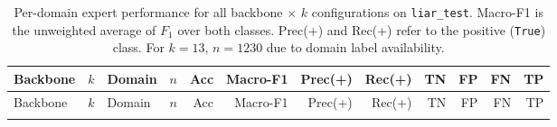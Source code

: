 \begin{landscape}
\setlength{\tabcolsep}{3pt}
\renewcommand{\arraystretch}{1.05}
\begin{longtable}{@{}l r l r r r r r r r r r@{}}
\caption[Per-domain expert performance for all backbone $\times$ $k$ configurations on \texttt{liar\_test}.]{Per-domain expert performance for all backbone $\times$ $k$ configurations on \texttt{liar\_test}. Macro-F1 is the unweighted average of $F_1$ over both classes. Prec(+) and Rec(+) refer to the positive (\texttt{True}) class. For $k{=}13$, $n{=}1230$ due to domain label availability.}
\label{tab:expert_per_domain}\\
\toprule
Backbone & $k$ & Domain & $n$ & Acc & Macro-F1 & Prec(+) & Rec(+) & TN & FP & FN & TP\\
\midrule
\endfirsthead
\toprule
Backbone & $k$ & Domain & $n$ & Acc & Macro-F1 & Prec(+) & Rec(+) & TN & FP & FN & TP\\
\midrule
\endhead
\bottomrule
\endfoot


\end{longtable}
\end{landscape}
